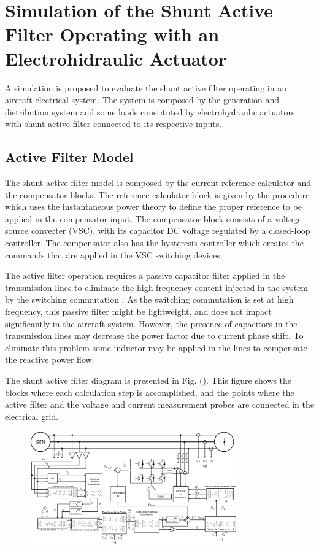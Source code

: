 \section{Simulation of the Shunt Active Filter Operating with an Electrohidraulic Actuator}

A simulation is proposed to evaluate the shunt active filter operating in an aircraft electrical system. The system is composed by the generation and distribution system and some loads constituted by electrohydraulic actuators with shunt active filter connected to its respective inputs.

\subsection{Active Filter Model}

The shunt active filter model is composed by the current reference calculator and the compensator blocks. The reference calculator block is given by the procedure which uses the instantaneous power theory to define the proper reference to be applied in the compensator input. The compensator block consists of a voltage source converter (VSC), with its capacitor DC voltage regulated by a closed-loop controller. The compensator also has the hysteresis controller which creates the commands that are applied in the VSC switching devices.

The active filter operation requires a passive capacitor filter applied in the transmission lines to eliminate the high frequency content injected in the system by the switching commutation \cite{}. As the switching commutation is set at high frequency, this passive filter might be lightweight, and does not impact significantly in the aircraft system. However, the presence of capacitors in the transmission lines may decrease the power factor due to current phase shift. To eliminate this problem some inductor may be applied in the lines to compensate the reactive power flow.

The shunt active filter diagram is presented in Fig. (). This figure shows the blocks where each calculation step is accomplished, and the points where the active filter and the voltage and current measurement probes are connected in the electrical grid.

\begin{figure}[!tb] %
	\centering
	\includegraphics[width=0.8\textwidth]{Figures/filtro_blocos.png}
	\caption{}
	\label{fig:filtro_blocos.png}
\end{figure}

